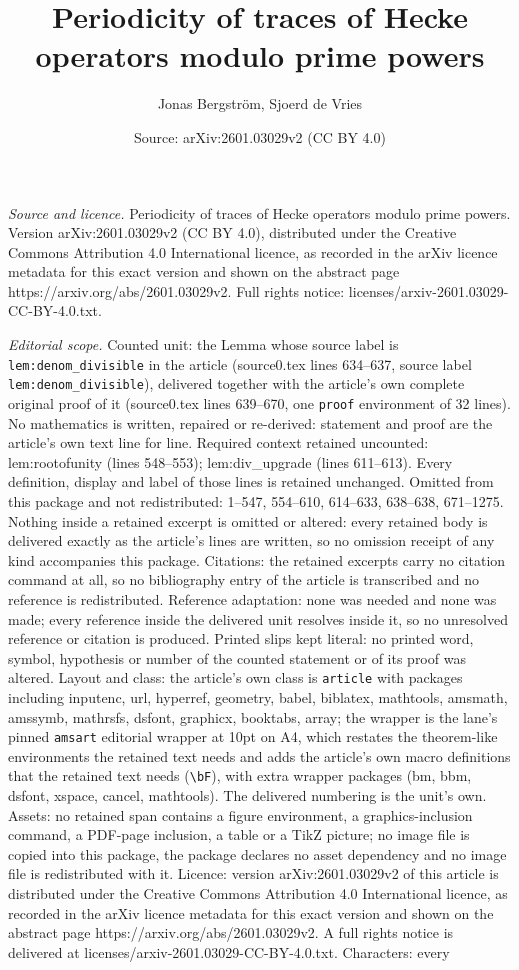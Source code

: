 \documentclass[10pt,a4paper]{amsart}
\title[Periodicity of traces of Hecke operators modulo prime powers]{Periodicity of traces of Hecke operators modulo prime powers}
\author{Jonas Bergstr\"om, Sjoerd de Vries}
\date{Source: arXiv:2601.03029v2 (CC BY 4.0)}
\begin{document}
\maketitle

\noindent\emph{Source and licence.} Periodicity of traces of Hecke operators modulo prime powers. Version arXiv:2601.03029v2 (CC BY 4.0), distributed under the Creative Commons Attribution 4.0 International licence, as recorded in the arXiv licence metadata for this exact version and shown on the abstract page https://arxiv.org/abs/2601.03029v2. Full rights notice: licenses/arxiv-2601.03029-CC-BY-4.0.txt.\par\smallskip

\noindent\textit{Editorial scope.} Counted unit: the Lemma whose source label is \texttt{lem:denom\_divisible} in the article (source0.tex lines 634--637, source label \texttt{lem:denom\_divisible}), delivered together with the article's own complete original proof of it (source0.tex lines 639--670, one \texttt{proof} environment of 32 lines). No mathematics is written, repaired or re-derived: statement and proof are the article's own text line for line. Required context retained uncounted: lem:rootofunity (lines 548--553); lem:div\_upgrade (lines 611--613). Every definition, display and label of those lines is retained unchanged. Omitted from this package and not redistributed: 1--547, 554--610, 614--633, 638--638, 671--1275. Nothing inside a retained excerpt is omitted or altered: every retained body is delivered exactly as the article's lines are written, so no omission receipt of any kind accompanies this package. Citations: the retained excerpts carry no citation command at all, so no bibliography entry of the article is transcribed and no reference is redistributed. Reference adaptation: none was needed and none was made; every reference inside the delivered unit resolves inside it, so no unresolved reference or citation is produced. Printed slips kept literal: no printed word, symbol, hypothesis or number of the counted statement or of its proof was altered. Layout and class: the article's own class is \texttt{article} with packages including inputenc, url, hyperref, geometry, babel, biblatex, mathtools, amsmath, amssymb, mathrsfs, dsfont, graphicx, booktabs, array; the wrapper is the lane's pinned \texttt{amsart} editorial wrapper at 10pt on A4, which restates the theorem-like environments the retained text needs and adds the article's own macro definitions that the retained text needs (\texttt{\textbackslash bF}), with extra wrapper packages (bm, bbm, dsfont, xspace, cancel, mathtools). The delivered numbering is the unit's own. Assets: no retained span contains a figure environment, a graphics-inclusion command, a PDF-page inclusion, a table or a TikZ picture; no image file is copied into this package, the package declares no asset dependency and no image file is redistributed with it. Licence: version arXiv:2601.03029v2 of this article is distributed under the Creative Commons Attribution 4.0 International licence, as recorded in the arXiv licence metadata for this exact version and shown on the abstract page https://arxiv.org/abs/2601.03029v2. A full rights notice is delivered at licenses/arxiv-2601.03029-CC-BY-4.0.txt. Characters: every 
\end{document}
